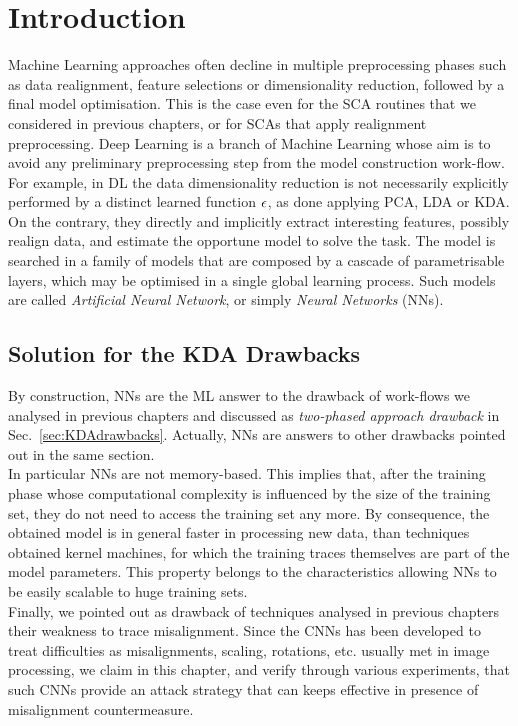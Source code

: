 \section{Introduction}
Machine Learning approaches often decline in multiple preprocessing phases such as data realignment, feature selections or dimensionality reduction, followed by a final model optimisation. This is the case even for the SCA routines that we considered in previous chapters, or for SCAs that apply realignment preprocessing. Deep Learning is a branch of Machine Learning whose aim is to avoid any preliminary preprocessing step from the model construction work-flow. For example, in DL the data dimensionality reduction is not necessarily explicitly performed by a distinct learned  function $\epsilon$, as done applying PCA, LDA or KDA. On the contrary, they directly and implicitly extract interesting features, possibly realign data, and estimate the opportune model to solve the task. The model is searched in a family of models that are composed by a cascade of parametrisable layers, which may be optimised in a single global learning process. Such models are called \emph{Artificial Neural Network}, or simply \emph{Neural Networks} (NNs). 

\subsection*{Solution for the KDA Drawbacks}
By construction, NNs are the ML answer to the drawback of work-flows we analysed in previous chapters and discussed as \emph{two-phased approach drawback} in Sec.~\ref{sec:KDAdrawbacks}. Actually, NNs are answers to other drawbacks pointed out in the same section. \\

In particular NNs are not memory-based. This implies that, after the training phase whose computational complexity is influenced by the size of the training set, they do not need to access the training set any more. By consequence, the obtained model is in general faster in processing new data, than techniques obtained \via kernel machines, for which the training traces themselves are part of the model parameters. This property belongs to the characteristics allowing NNs to be easily scalable to huge training sets.\\

Finally, we pointed out as drawback of techniques analysed in previous chapters their weakness to trace misalignment. Since the CNNs has been developed to treat difficulties as misalignments, scaling, rotations, etc. usually met in image processing,  we claim in this chapter, and verify through various experiments, that such CNNs provide an attack strategy that can keeps effective in presence of misalignment countermeasure. 

